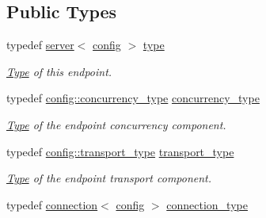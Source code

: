 \subsection*{Public Types}
\begin{DoxyCompactItemize}
\item 
\mbox{\label{classwebsocketpp_1_1server_a265fd3d99141089206f0053c6b842790}} 
typedef \mbox{\hyperlink{classwebsocketpp_1_1server}{server}}$<$ \mbox{\hyperlink{classconfig}{config}} $>$ \mbox{\hyperlink{classwebsocketpp_1_1server_a265fd3d99141089206f0053c6b842790}{type}}
\begin{DoxyCompactList}\small\item\em \mbox{\hyperlink{struct_type}{Type}} of this endpoint. \end{DoxyCompactList}\item 
\mbox{\label{classwebsocketpp_1_1server_ad389e3f96682b13a16f2bf01568eeabd}} 
typedef \mbox{\hyperlink{classwebsocketpp_1_1concurrency_1_1none}{config\+::concurrency\+\_\+type}} \mbox{\hyperlink{classwebsocketpp_1_1server_ad389e3f96682b13a16f2bf01568eeabd}{concurrency\+\_\+type}}
\begin{DoxyCompactList}\small\item\em \mbox{\hyperlink{struct_type}{Type}} of the endpoint concurrency component. \end{DoxyCompactList}\item 
\mbox{\label{classwebsocketpp_1_1server_a762a51efebd0c0f87918f0369434f04f}} 
typedef \mbox{\hyperlink{classwebsocketpp_1_1transport_1_1asio_1_1endpoint}{config\+::transport\+\_\+type}} \mbox{\hyperlink{classwebsocketpp_1_1server_a762a51efebd0c0f87918f0369434f04f}{transport\+\_\+type}}
\begin{DoxyCompactList}\small\item\em \mbox{\hyperlink{struct_type}{Type}} of the endpoint transport component. \end{DoxyCompactList}\item 
\mbox{\label{classwebsocketpp_1_1server_a82d3d94b70a49b2073c9b3378ec7047c}} 
typedef \mbox{\hyperlink{classwebsocketpp_1_1connection}{connection}}$<$ \mbox{\hyperlink{classconfig}{config}} $>$ \mbox{\hyperlink{classwebsocketpp_1_1server_a82d3d94b70a49b2073c9b3378ec7047c}{connection\+\_\+type}}

\end{DoxyCompactItemize}

